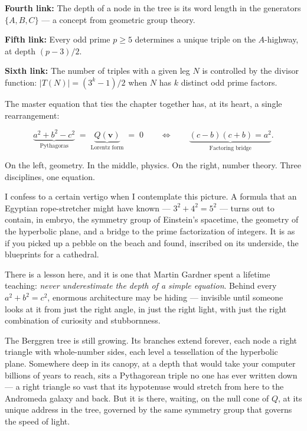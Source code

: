 \documentclass[11pt,twoside,openright]{book}
\theoremstyle{definition}
\theoremstyle{remark}
\begin{document}
\textbf{Fourth link:} The depth of a node in the tree is its word length in the generators $\{A, B, C\}$ --- a concept from geometric group theory.

\textbf{Fifth link:} Every odd prime $p \geq 5$ determines a unique triple on the $A$-highway, at depth $(p - 3)/2$.

\textbf{Sixth link:} The number of triples with a given leg $N$ is controlled by the divisor function: $|T(N)| = (3^k - 1)/2$ when $N$ has $k$ distinct odd prime factors.

The master equation that ties the chapter together has, at its heart, a single rearrangement:

\[\underbrace{a^2 + b^2 - c^2}_{\text{Pythagoras}} \;=\; \underbrace{Q(\mathbf{v})}_{\text{Lorentz form}} \;=\; 0 \qquad\Longleftrightarrow\qquad \underbrace{(c - b)(c + b) = a^2}_{\text{Factoring bridge}}.\]

On the left, geometry. In the middle, physics. On the right, number theory. Three disciplines, one equation.


I confess to a certain vertigo when I contemplate this picture. A formula that an Egyptian rope-stretcher might have known --- $3^2 + 4^2 = 5^2$ --- turns out to contain, in embryo, the symmetry group of Einstein's spacetime, the geometry of the hyperbolic plane, and a bridge to the prime factorization of integers. It is as if you picked up a pebble on the beach and found, inscribed on its underside, the blueprints for a cathedral.

There is a lesson here, and it is one that Martin Gardner spent a lifetime teaching: \textit{never underestimate the depth of a simple equation}. Behind every $a^2 + b^2 = c^2$, enormous architecture may be hiding --- invisible until someone looks at it from just the right angle, in just the right light, with just the right combination of curiosity and stubbornness.

The Berggren tree is still growing. Its branches extend forever, each node a right triangle with whole-number sides, each level a tessellation of the hyperbolic plane. Somewhere deep in its canopy, at a depth that would take your computer billions of years to reach, sits a Pythagorean triple no one has ever written down --- a right triangle so vast that its hypotenuse would stretch from here to the Andromeda galaxy and back. But it is there, waiting, on the null cone of $Q$, at its unique address in the tree, governed by the same symmetry group that governs the speed of light.
\end{document}
